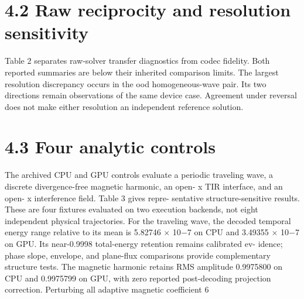 \documentclass[11pt]{article}
\begin{document}
\section*{4.2 Raw reciprocity and resolution sensitivity}

Table 2 separates raw-solver transfer diagnostics from codec fidelity. Both reported summaries
are below their inherited comparison limits. The largest resolution discrepancy occurs in the ood
homogeneous-wave pair. Its two directions remain observations of the same device case. Agreement
under reversal does not make either resolution an independent reference solution.

\section*{4.3 Four analytic controls}

The archived CPU and GPU controls evaluate a periodic traveling wave, a discrete divergence-free
magnetic harmonic, an open- x TIR interface, and an open- x interference field. Table 3 gives repre-
sentative structure-sensitive results. These are four fixtures evaluated on two execution backends,
not eight independent physical trajectories.
For the traveling wave, the decoded temporal energy range relative to its mean is 5.82746 \ensuremath{\times} 10\ensuremath{-}7
on CPU and 3.49355 \ensuremath{\times} 10\ensuremath{-}7 on GPU. Its near-0.9998 total-energy retention remains calibrated ev-
idence; phase slope, envelope, and plane-flux comparisons provide complementary structure tests.
The magnetic harmonic retains RMS amplitude 0.9975800 on CPU and 0.9975799 on GPU, with
zero reported post-decoding projection correction. Perturbing all adaptive magnetic coefficient
6
\end{document}
